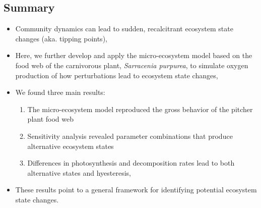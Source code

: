 \documentclass[a0,landscape]{a0poster}
\begin{document}
\begin{multicols}{4} %


\color{black} %

\section*{Summary}
  
  \begin{itemize}
  \item Community dynamics can lead to sudden, recalcitrant ecosystem
    state changes (aka. tipping points),
  \item Here, we further develop and apply the micro-ecosystem model
    based on the food web of the carnivorous plant, \textit{Sarracenia
      purpurea}, to simulate oxygen production of how perturbations
    lead to ecosystem state changes,
  \item We found three main results:
    \begin{enumerate}
    \item The micro-ecosystem model reproduced the gross behavior of
      the pitcher plant food web
    \item Sensitivity analysis revealed parameter combinations that
      produce alternative ecosystem states
    \item Differences in photosynthesis and decomposition rates lead
      to both alternative states and hyesteresis,
    \end{enumerate}
  \item These results point to a general framework for identifying
    potential ecosystem state changes. 
  \end{itemize}





\end{multicols}
\end{document}

